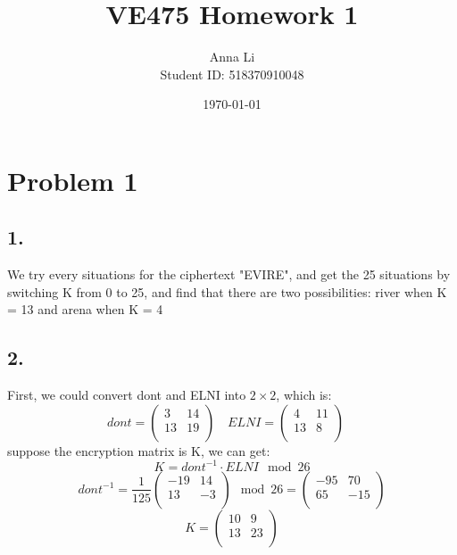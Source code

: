 \documentclass[a4paper,12pt]{journal}
\title{VE475 Homework 1}
\author{Anna Li \\Student ID: 518370910048}
\date{\today}
\begin{document}
	\maketitle
	\section*{Problem 1}
	\subsection*{1.}
	We try every situations for the ciphertext "EVIRE", and get the 25 situations  by switching K from 0 to 25, and find that there are two possibilities: river when K = 13 and arena when K = 4\\
	\subsection*{2.}
	First, we could convert dont and ELNI into $2\times 2$, which is:
	\begin{equation}
		dont=\begin{pmatrix}
			3&14\\13&19\\
		\end{pmatrix}\quad 
	ELNI = \begin{pmatrix}
		4&11\\13&8\\
	\end{pmatrix}\quad 
	\end{equation}
suppose the encryption matrix is K, we can get:
\begin{equation}
K=dont^{-1}\cdot ELNI \mod 26
\end{equation}
\begin{equation}
dont^{-1}=\frac{1}{125}\begin{pmatrix}-19&14\\13&-3\\\end{pmatrix}\mod 26 = \begin{pmatrix}
	-95&70\\65&-15\\
\end{pmatrix}
\end{equation}
\begin{equation}
K=\begin{pmatrix}
10&9\\13&23\\
\end{pmatrix}
\end{equation}
\end{document}
